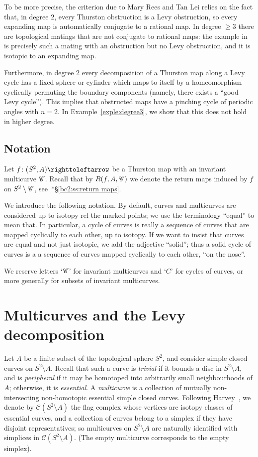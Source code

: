 \documentclass{amsart}
\begin{document}
To be more precise, the criterion due to Mary Rees and Tan Lei relies
on the fact that, in degree $2$, every Thurston obstruction is a Levy
obstruction, so every expanding map is automatically conjugate to a
rational map. In degree $\ge3$ there are topological matings that are
not conjugate to rational maps: the example
in~\cite{shishikura-t:matings} is precisely such a mating with an
obstruction but no Levy obstruction, and it is isotopic to an
expanding map. 

Furthermore, in degree $2$ every decomposition of a Thurston map along
a Levy cycle has a fixed sphere or cylinder which maps to itself by a
homeomorphism cyclically permuting the boundary components (namely,
there exists a ``good Levy cycle''). This implies that obstructed maps
have a pinching cycle of periodic angles with $n=2$. In
Example~\ref{exple:degree3}, we show that this does not hold in higher
degree.

\subsection{Notation}
Let $f\colon(S^2, A)\selfmap$ be a Thurston map with an invariant
multicurve ${\mathscr C}$. Recall that by $R(f,A,{\mathscr C})$ we denote the return maps
induced by $f$ on $S^2\setminus{\mathscr C}$,
see~\cite{bartholdi-dudko:bc2}*{\S\ref{bc2:ss:return maps}}.

We introduce the following notation. By default, curves and
multicurves are considered up to isotopy rel the marked points; we use
the terminology ``equal'' to mean that. In particular, a cycle of
curves is really a sequence of curves that are mapped cyclically to
each other, up to isotopy. If we want to insist that curves are equal
and not just isotopic, we add the adjective ``solid''; thus a solid
cycle of curves is a a sequence of curves mapped cyclically to each
other, ``on the nose''.

We reserve letters `${\mathscr C}$' for invariant multicurves and `$C$' for
cycles of curves, or more generally for subsets of invariant
multicurves.

\section{Multicurves and the Levy decomposition}
Let $A$ be a finite subset of the topological sphere $S^2$, and
consider simple closed curves on $S^2\setminus A$. Recall that such a
curve is \emph{trivial} if it bounds a disc in $S^2\setminus A$, and
is \emph{peripheral} if it may be homotoped into arbitrarily small
neighbourhoods of $A$; otherwise, it is \emph{essential}. A
\emph{multicurve} is a collection of mutually non-intersecting
non-homotopic essential simple closed curves. Following
Harvey~\cite{harvey:curvecomplex}, we denote by
$\mathcal C(S^2\setminus A)$ the flag complex whose vertices are
isotopy classes of essential curves, and a collection of curves belong
to a simplex if they have disjoint representatives; so multicurves on
$S^2\setminus A$ are naturally identified with simplices in
$\mathcal C(S^2\setminus A)$. (The empty multicurve corresponds to the
empty simplex).
\end{document}
